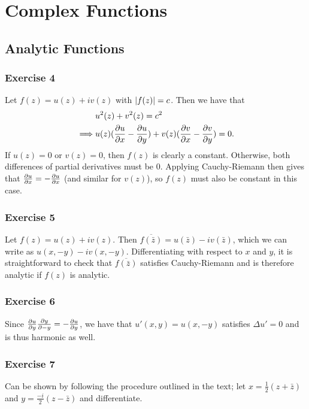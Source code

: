 \section{Complex Functions}

\subsection{Analytic Functions}

\subsubsection{Exercise 4}
Let $f(z) = u(z) + iv(z)$ with $\abs{f(z)} = c$. Then we have that
\begin{align*}
        &u^2(z) + v^2(z) = c^2 \\
        \implies &u(z) (\pdv{u}{x} - \pdv{u}{y}) + v(z) (\pdv{v}{x} - \pdv{v}{y}) = 0.
\end{align*}
If $u(z) = 0$ or $v(z) = 0$, then $f(z)$ is clearly a constant. Otherwise, both differences of partial 
derivatives must be 0. Applying Cauchy-Riemann then gives that $\pdv{u}{x} = -\pdv{u}{x}$ (and similar for
$v(z)$), so $f(z)$ must also be constant in this case. 

\subsubsection{Exercise 5}
Let $f(z) = u(z) + iv(z)$. Then $\overline{f(\bar{z})} = u(\bar{z}) - iv(\bar{z})$, which we can write as
$u(x, -y) - iv(x, -y)$. Differentiating with respect to $x$ and $y$, it is straightforward to check that
$\overline{f(\bar{z})}$ satisfies Cauchy-Riemann and is therefore analytic if $f(z)$ is analytic.

\subsubsection{Exercise 6}
Since $\pdv{u}{y} \pdv{y}{-y} = -\pdv{u}{y}$, we have that $u'(x, y) = u(x, -y)$ satisfies $\Delta u' = 0$ and
is thus harmonic as well.

\subsubsection{Exercise 7}
Can be shown by following the procedure outlined in the text; let $x = \frac{1}{2} (z + \bar{z})$ and
$y = \frac{-i}{2} (z - \bar{z})$ and differentiate.



